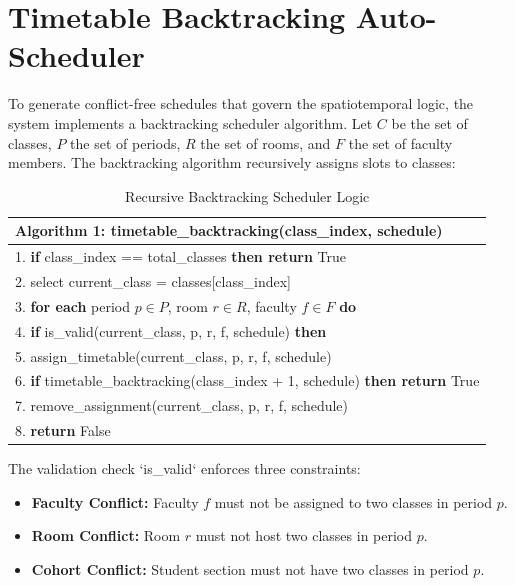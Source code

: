 \documentclass[12pt,a4paper,oneside]{report}
\begin{document}
\section{Timetable Backtracking Auto-Scheduler}
To generate conflict-free schedules that govern the spatiotemporal logic, the system implements a backtracking scheduler algorithm. Let $C$ be the set of classes, $P$ the set of periods, $R$ the set of rooms, and $F$ the set of faculty members. The backtracking algorithm recursively assigns slots to classes:

\begin{table}[htbp]
\caption{Recursive Backtracking Scheduler Logic}
\centering
\small
{}
\begin{tabular}{p{5.5in}}
\hline
\textbf{Algorithm 1: timetable\_backtracking(class\_index, schedule)} \\ \hline
1. \textbf{if} class\_index == total\_classes \textbf{then return} True \\
2. select current\_class = classes[class\_index] \\
3. \textbf{for each} period $p \in P$, room $r \in R$, faculty $f \in F$ \textbf{do} \\
4. \quad \textbf{if} is\_valid(current\_class, p, r, f, schedule) \textbf{then} \\
5. \quad\quad assign\_timetable(current\_class, p, r, f, schedule) \\
6. \quad\quad \textbf{if} timetable\_backtracking(class\_index + 1, schedule) \textbf{then return} True \\
7. \quad\quad remove\_assignment(current\_class, p, r, f, schedule) \\
8. \textbf{return} False \\ \hline
\end{tabular}
\label{tab:backtracking_algo}
\end{table}

The validation check `is\_valid` enforces three constraints:
\begin{itemize}
    \item \textbf{Faculty Conflict:} Faculty $f$ must not be assigned to two classes in period $p$.
    \item \textbf{Room Conflict:} Room $r$ must not host two classes in period $p$.
    \item \textbf{Cohort Conflict:} Student section must not have two classes in period $p$.
\end{itemize}
\end{document}
